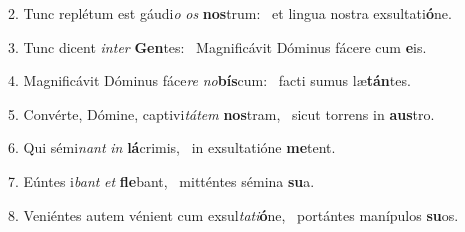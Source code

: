 2. Tunc replétum est gáudi\textit{o} \textit{os} \textbf{nos}trum: \ast\  et lingua nostra exsultati\textbf{ó}ne.\

3. Tunc dicent \textit{in}\textit{ter} \textbf{Gen}tes: \ast\  Magnificávit Dóminus fácere cum \textbf{e}is.\

4. Magnificávit Dóminus fáce\textit{re} \textit{no}\textbf{bís}cum: \ast\  facti sumus læ\textbf{tán}tes.\

5. Convérte, Dómine, captivi\textit{tá}\textit{tem} \textbf{nos}tram, \ast\  sicut torrens in \textbf{aus}tro.\

6. Qui sémi\textit{nant} \textit{in} \textbf{lá}crimis, \ast\  in exsultatióne \textbf{me}tent.\

7. Eúntes i\textit{bant} \textit{et} \textbf{fle}bant, \ast\  mitténtes sémina \textbf{su}a.\

8. Veniéntes autem vénient cum exsul\textit{ta}\textit{ti}\textbf{ó}ne, \ast\  portántes manípulos \textbf{su}os.\

